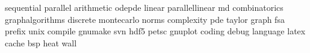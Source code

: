 sequential
parallel
arithmetic
odepde
linear
parallellinear
md
combinatorics
graphalgorithms
discrete
montecarlo
norms
complexity
pde
taylor
graph
fsa
prefix
unix
compile
gnumake
svn
hdf5
petsc
gnuplot
coding
debug
language
latex
cache
bsp
heat
wall
